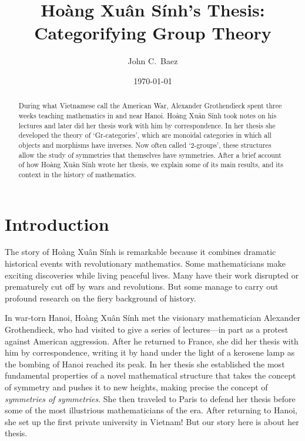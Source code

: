 \documentclass[reqno,12pt]{amsart}
\theoremstyle{definition}
\begin{document}
\title{Ho\`ang Xu\^an S\'inh's Thesis: \\ Categorifying Group Theory}
\author[Baez]{John C.\ Baez} 
\address{Department of Mathematics, University of California, Riverside CA, 92521, USA}
\address{Centre for Quantum Technologies, National University of Singapore, 117543, Singapore}
\date{\today}
\maketitle

\begin{abstract}
During what Vietnamese call the American War, Alexander Grothendieck spent three weeks teaching mathematics in and near Hanoi.  Ho\`ang Xu\^an S\'inh took notes on his lectures and later did her thesis work with him by correspondence.  In her thesis she developed the theory of `Gr-categories', which are monoidal categories in which all objects and morphisms have inverses.   Now often called `2-groups', these structures allow the study of symmetries that themselves have symmetries. After a brief account of how Ho\`ang Xu\^an S\'inh wrote her thesis, we explain some of its main results, and its context in the history of mathematics.
\end{abstract}


\section{Introduction}

The story of Ho\`ang Xu\^an S\'inh is remarkable because it combines dramatic historical events with revolutionary mathematics.  Some mathematicians make exciting discoveries while living peaceful lives.  Many have their work disrupted or prematurely cut off by wars and revolutions.  But some manage to carry out profound research on the fiery background of  history.

In war-torn Hanoi, Ho\`ang Xu\^an S\'inh met the visionary mathematician Alexander Grothendieck, who had visited to give a series of lectures---in part as a protest against American aggression.  After he returned to France, she did her thesis with him by correspondence, writing it by hand under the light of a kerosene lamp as the bombing of Hanoi reached its peak.  In her thesis she established the most fundamental properties of a novel mathematical structure that takes the concept of symmetry and pushes it to new heights, making precise the concept of \emph{symmetries of symmetries}.   She then traveled to Paris to defend her thesis before some of the most illustrious mathematicians of the era.   After returning to Hanoi, she set up the first private university in Vietnam!   But our story here is about her thesis.
\end{document}

